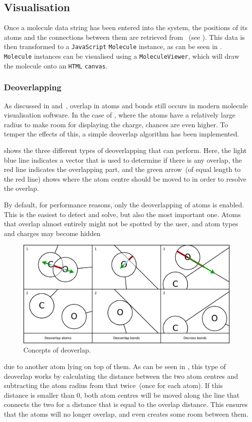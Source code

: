 \subsection{Visualisation}
Once a molecule data string has been entered into the system, the positions of its atoms and the connections between them are retrieved from \oapoc~(see ). This data is then transformed to a \verb|JavaScript| \verb|Molecule| instance, as can be seen in . \verb|Molecule| instances can be visualised using a \verb|MoleculeViewer|, which will draw the molecule onto an \verb|HTML| \verb|canvas|.


\subsubsection{Deoverlapping}
As discussed in  and~\cite{clark2006structure}, overlap in atoms and bonds still occurs in modern molecule visualisation software. In the case of \oframp, where the atoms have a relatively large radius to make room for displaying the charge, chances are even higher. To temper the effects of this, a simple deoverlap algorithm has been implemented.

 shows the three different types of deoverlapping that \oframp{} can perform. Here, the light blue line indicates a vector that is used to determine if there is any overlap, the red line indicates the overlapping part, and the green arrow~(of equal length to the red line) shows where the atom centre should be moved to in order to resolve the overlap.


By default, for performance reasons, only the deoverlapping of atoms is enabled. This is the easiest to detect and solve, but also the most important one. Atoms that overlap almost entirely might not be spotted by the user, and atom types and charges may become hidden 
\begin{figure}
\center
\includegraphics[width=\textwidth]{img/deoverlap.pdf}
\caption{Concepts of deoverlap.}
\end{figure}due to another atom lying on top of them. As can be seen in , this type of deoverlap works by calculating the distance between the two atom centres and subtracting the atom radius from that twice~(once for each atom). If this distance is smaller than $0$, both atom centres will be moved along the line that connects the two for a distance that is equal to the overlap distance. This ensures that the atoms will no longer overlap, and even creates some room between them.

